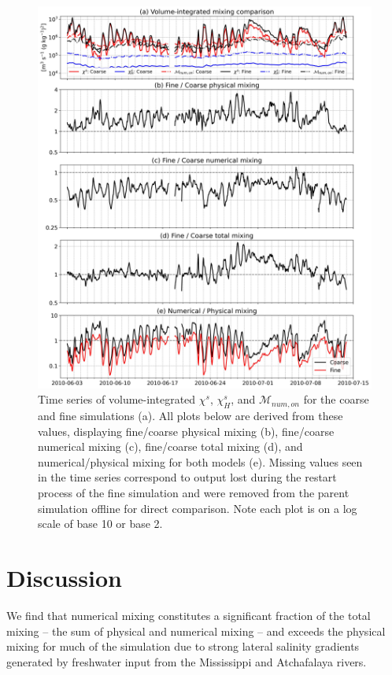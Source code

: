\begin{figure}
 \centerline{\includegraphics[width = 0.9\linewidth]{figures/james_2023/Figure9_vintegrated.jpg}}
  \caption{Time series of volume-integrated $\chi^s$, $\chi_H^s$,  and $\mathcal{M}_{num, on}$ for the coarse and fine simulations (a). All plots below are derived from these values, displaying fine/coarse physical mixing (b), fine/coarse numerical mixing (c), fine/coarse total mixing (d), and numerical/physical mixing for both models (e). Missing values seen in the time series correspond to output lost during the restart process of the fine simulation and were removed from the parent simulation offline for direct comparison. Note each plot is on a log scale of base 10 or base 2.}
  \label{fig:volume-integrated}
\end{figure}

\section{Discussion} \label{sec:discussion_2023}

We find that numerical mixing constitutes a significant fraction of the total mixing -- the sum of physical and numerical mixing -- and exceeds the physical mixing for much of the simulation due to strong lateral salinity gradients generated by freshwater input from the Mississippi and Atchafalaya rivers.

